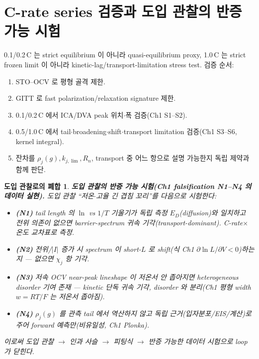 \documentclass[11pt,a4paper]{article}
\newtheorem*{loopbox}{도입 관찰로의 폐합}
\begin{document}
\section{C-rate series 검증과 도입 관찰의 반증 가능 시험}\label{sec:ch6_crate}
0.1/0.2\,C 는 strict equilibrium 이 아니라 quasi-equilibrium proxy, 1.0\,C 는 strict frozen limit 이 아니라
kinetic-lag/transport-limitation stress test. 검증 순서:
\begin{enumerate}[label=C\arabic*),leftmargin=2.2em]
\item STO--OCV 로 평형 골격 제한.
\item GITT 로 fast polarization/relaxation signature 제한.
\item 0.1/0.2\,C 에서 ICA/DVA peak 위치$\cdot$폭 검증(Ch1 S1--S2).
\item 0.5/1.0\,C 에서 tail$\cdot$broadening$\cdot$shift$\cdot$transport limitation 검증(Ch1 S3--S6, kernel integral).
\item 잔차를 $\rho_j(g),k_{j,\lim},R_n$, transport 중 어느 항으로 설명 가능한지 독립 제약과 함께 판단.
\end{enumerate}
\begin{loopbox}
\textbf{도입 관찰의 반증 가능 시험(Ch1 falsification N1--N4 의 데이터 실현).} 도입 관찰 ``저온$\cdot$고율 긴
겹침 꼬리''를 다음으로 시험한다:
\begin{itemize}[leftmargin=1.4em]
\item \textbf{(N1)} tail length 의 $\ln$ vs $1/T$ 기울기가 독립 측정 $E_D$(diffusion)와 일치하고 \emph{전위
  의존이 없으면} barrier-spectrum 귀속 \emph{기각}(transport-dominant). C-rate$\times$온도 교차표로 측정.
\item \textbf{(N2)} 전위/$|I|$ 증가 시 spectrum 이 short-$L$ 로 shift(식 Ch1 $\partial\ln L/\partial V<0$)하는지 —
  없으면 $\chi_j$ 항 \emph{기각}.
\item \textbf{(N3)} 저속 OCV near-peak lineshape 이 저온서 안 좁아지면 heterogeneous disorder 기여 존재 —
  kinetic 단독 귀속 기각, disorder 와 분리(Ch1 평형 width $w=RT/F$ 는 저온서 좁아짐).
\item \textbf{(N4)} $\rho_j(g)$ 를 관측 tail 에서 \emph{역산하지 않고} 독립 근거(입자분포/EIS/계산)로 주어
  forward 예측만(비유일성, Ch1 Plonka).
\end{itemize}
이로써 도입 관찰 $\to$ 인과 사슬 $\to$ 피팅식 $\to$ \emph{반증 가능한 데이터 시험}으로 loop 가 닫힌다.
\end{loopbox}
\end{document}
